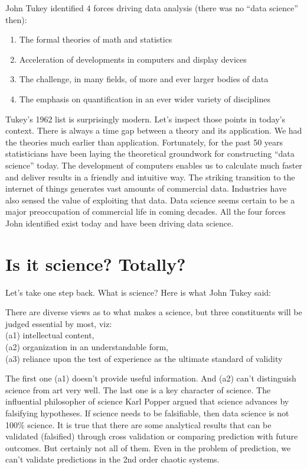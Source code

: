 \documentclass[12pt,]{krantz}
\providecommand{\tightlist}{%
  \setlength{\itemsep}{0pt}\setlength{\parskip}{0pt}}
\renewenvironment{quote}{\begin{VF}}{\end{VF}}
\theoremstyle{definition}
\theoremstyle{definition}
\theoremstyle{remark}
\begin{document}
John Tukey identified 4 forces driving data analysis (there was no
``data science'' then):

\begin{enumerate}
\def\labelenumi{\arabic{enumi}.}
\tightlist
\item
  The formal theories of math and statistics
\item
  Acceleration of developments in computers and display devices
\item
  The challenge, in many fields, of more and ever larger bodies of data
\item
  The emphasis on quantification in an ever wider variety of disciplines
\end{enumerate}

Tukey's 1962 list is surprisingly modern. Let's inspect those points in
today's context. There is always a time gap between a theory and its
application. We had the theories much earlier than application.
Fortunately, for the past 50 years statisticians have been laying the
theoretical groundwork for constructing ``data science'' today. The
development of computers enables us to calculate much faster and deliver
results in a friendly and intuitive way. The striking transition to the
internet of things generates vast amounts of commercial data. Industries
have also sensed the value of exploiting that data. Data science seems
certain to be a major preoccupation of commercial life in coming
decades. All the four forces John identified exist today and have been
driving data science.

\section{Is it science? Totally?}\label{is-it-science-totally}

Let's take one step back. What is science? Here is what John Tukey said:

\begin{quote}
There are diverse views as to what makes a science, but three
constituents will be judged essential by most, viz:\\
(a1) intellectual content,\\
(a2) organization in an understandable form,\\
(a3) reliance upon the test of experience as the ultimate standard of
validity
\end{quote}

The first one (a1) doesn't provide useful information. And (a2) can't
distinguish science from art very well. The last one is a key character
of science. The influential philosopher of science Karl Popper argued
that science advances by falsifying hypotheses. If science needs to be
falsifiable, then data science is not 100\% science. It is true that
there are some analytical results that can be validated (falsified)
through cross validation or comparing prediction with future outcomes.
But certainly not all of them. Even in the problem of prediction, we
can't validate predictions in the 2nd order chaotic systems.
\end{document}
